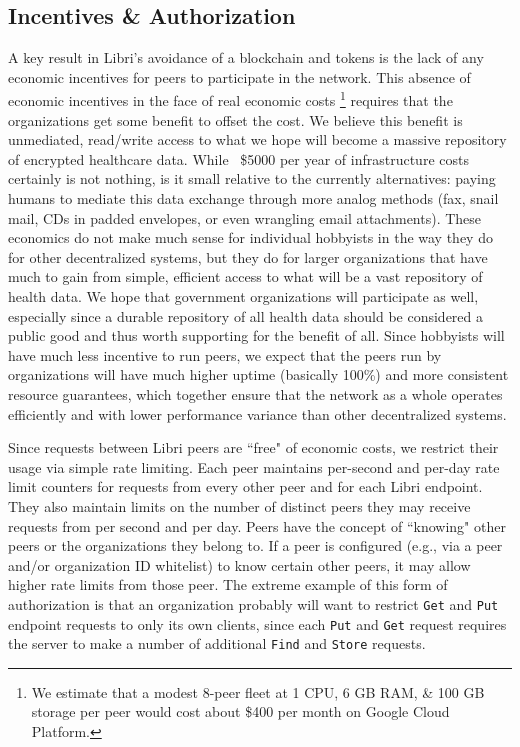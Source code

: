 \documentclass[10pt]{article}
\newcommand{\ttt}[1]{\texttt{#1}}
\begin{document}
\subsection{Incentives \& Authorization}
\label{sec:Incentives}
A key result in Libri's avoidance of a blockchain and tokens is the lack of any economic incentives for peers to participate in the network. This absence of economic incentives in the face of real economic costs \footnote{We estimate that a modest 8-peer fleet at 1 CPU, 6 GB RAM, \& 100 GB storage per peer would cost about \$400 per month on Google Cloud Platform.} requires that the organizations get some benefit to offset the cost. We believe this benefit is unmediated, read/write access to what we hope will become a massive repository of encrypted healthcare data. While ~\$5000 per year of infrastructure costs certainly is not nothing, is it small relative to the currently alternatives: paying humans to mediate this data exchange through more analog methods (fax, snail mail, CDs in padded envelopes, or even wrangling email attachments). These economics do not make much sense for individual hobbyists in the way they do for other decentralized systems, but they do for larger organizations that have much to gain from simple, efficient access to what will be a vast repository of health data. We hope that government organizations will participate as well, especially since a durable repository of all health data should be considered a public good and thus worth supporting for the benefit of all. Since hobbyists will have much less incentive to run peers, we expect that the peers run by organizations will have much higher uptime (basically 100\%) and more consistent resource guarantees, which together ensure that the network as a whole operates efficiently and with lower performance variance than other decentralized systems.

Since requests between Libri peers are ``free" of economic costs, we restrict their usage via simple rate limiting. Each peer maintains per-second and per-day rate limit counters for requests from every other peer and for each Libri endpoint. They also maintain limits on the number of distinct peers they may receive requests from per second and per day. Peers have the concept of ``knowing" other peers or the organizations they belong to. If a peer is configured (e.g., via a peer and/or organization ID whitelist) to know certain other peers, it may allow higher rate limits from those peer. The extreme example of this form of authorization is that an organization probably will want to restrict \ttt{Get} and \texttt{Put} endpoint requests to only its own clients, since each \texttt{Put} and \texttt{Get} request requires the server to make a number of additional \texttt{Find} and \texttt{Store} requests. 
\end{document}
